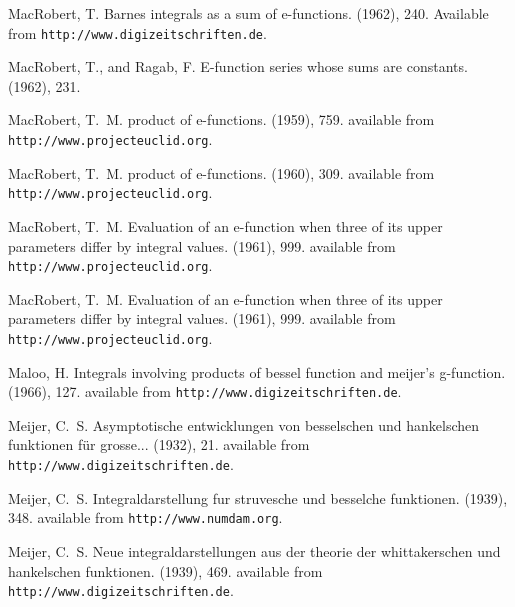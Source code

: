 \documentclass[11pt]{article}
\begin{document}
\begin{thebibliography}{10}
{\sc MacRobert, T.}
\newblock Barnes integrals as a sum of e-functions.
 (1962), 240.
\newblock Available from \texttt{http://www.digizeitschriften.de}.

{\sc MacRobert, T., and Ragab, F.}
\newblock E-function series whose sums are constants.
 (1962), 231.

{\sc MacRobert, T.~M.}
\newblock product of e-functions.
 (1959), 759.
\newblock available from \texttt{http://www.projecteuclid.org}.

{\sc MacRobert, T.~M.}
\newblock product of e-functions.
 (1960), 309.
\newblock available from \texttt{http://www.projecteuclid.org}.

{\sc MacRobert, T.~M.}
\newblock Evaluation of an e-function when three of its upper parameters differ
  by integral values.
 (1961), 999.
\newblock available from \texttt{http://www.projecteuclid.org}.

{\sc MacRobert, T.~M.}
\newblock Evaluation of an e-function when three of its upper parameters differ
  by integral values.
 (1961), 999.
\newblock available from \texttt{http://www.projecteuclid.org}.

{\sc Maloo, H.}
\newblock Integrals involving products of bessel function and meijer's
  g-function.
 (1966), 127.
\newblock available from \texttt{http://www.digizeitschriften.de}.

{\sc Meijer, C.~S.}
\newblock Asymptotische entwicklungen von besselschen und hankelschen
  funktionen f\"ur grosse...
 (1932), 21.
\newblock available from \texttt{http://www.digizeitschriften.de}.

{\sc Meijer, C.~S.}
\newblock Integraldarstellung fur struvesche und besselche funktionen.
 (1939), 348.
\newblock available from \texttt{http://www.numdam.org}.

{\sc Meijer, C.~S.}
\newblock Neue integraldarstellungen aus der theorie der whittakerschen und
  hankelschen funktionen.
 (1939), 469.
\newblock available from \texttt{http://www.digizeitschriften.de}.


\end{thebibliography}
\end{document}
